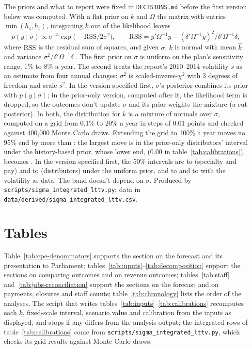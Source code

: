 The priors and what to report were fixed in \texttt{DECISIONS.md} before the first version below was computed. With a flat prior on \(k\) and \(\Omega\) the matrix with entries \(\min(h_s,h_t)\), integrating \(k\) out of the likelihood leaves
\[
p(y\mid\sigma)\propto\sigma^{-3}\operatorname{exp}\bigl(-\mathrm{RSS}/2\sigma^2\bigr),\qquad \mathrm{RSS}=y'\Omega^{-1}y-(\delta'\Omega^{-1}y)^2/\delta'\Omega^{-1}\delta,
\]
where \(\mathrm{RSS}\) is the residual sum of squares, and given \(\sigma\), \(k\) is normal with mean \(\hat k\) and variance \(\sigma^2/\delta'\Omega^{-1}\delta\) \citep[372]{GelmanBDA3}. The first prior on \(\sigma\) is uniform on the plan's sensitivity range, 1\% to 8\% a year. The second treats the report's 2010--2014 volatility \(s\) as an estimate from four annual changes: \(\sigma^2\) is scaled-inverse-\(\chi^2\) with 3 degrees of freedom and scale \(s^2\). In the version specified first, \(\sigma\)'s posterior combines its prior with \(p(y\mid\sigma)\); in the prior-only version, computed after it, the likelihood term is dropped, so the outcomes don't update \(\sigma\) and its prior weights the mixture (a cut posterior). In both, the distribution for \(k\) is a mixture of normals over \(\sigma\), computed on a grid from 0.1\% to 20\% a year in steps of 0.01 points and checked against 400,000 Monte Carlo draws. Extending the grid to 100\% a year moves no 95\% end by more than \lttvKIntGridShiftMax{}; the largest move is in the prior-only distributors' interval under the history-based prior, whose lower end, \lttvKIntBDUHistOnlyLoThree{} (0.00 in table~\ref{tab:calibrations}), becomes \lttvKIntBDUHistOnlyLoWide{}. In the version specified first, the 50\% intervals are \lttvKIntSpecUnifLoFifty{} to \lttvKIntSpecUnifHiFifty{} (specialty and pay) and \lttvKIntBDUUnifLoFifty{} to \lttvKIntBDUUnifHiFifty{} (distributors) under the uniform prior, and \lttvKIntSpecHistLoFifty{} to \lttvKIntSpecHistHiFifty{} and \lttvKIntBDUHistLoFifty{} to \lttvKIntBDUHistHiFifty{} with the volatility as data. The band doesn't depend on \(\sigma\). Produced by \texttt{scripts/sigma\_integrated\_lttv.py}; data in \texttt{data/derived/sigma\_integrated\_lttv.csv}.

\section{Tables}
\label{app:tables}

Table~\ref{tab:cpe-denominators} supports the section on the forecast and its presentation to Parliament; tables~\ref{tab:inputs}--\ref{tab:decomposition} support the sections on comparing outcomes and on revenue outcomes; tables~\ref{tab:staff} and~\ref{tab:jobs-reconciliation} support the sections on the forecast and on payments, closures and staff counts; table~\ref{tab:chronology} lists the order of the analyses. The script that writes tables~\ref{tab:inputs}--\ref{tab:calibrations} recomputes each \(k\), fixed-scale interval, scenario value and calibration from the inputs as displayed, and stops if any differs from the analysis output; the integrated rows of table~\ref{tab:calibrations} come from \texttt{scripts/sigma\_integrated\_lttv.py}, which checks its grid results against Monte Carlo draws.


